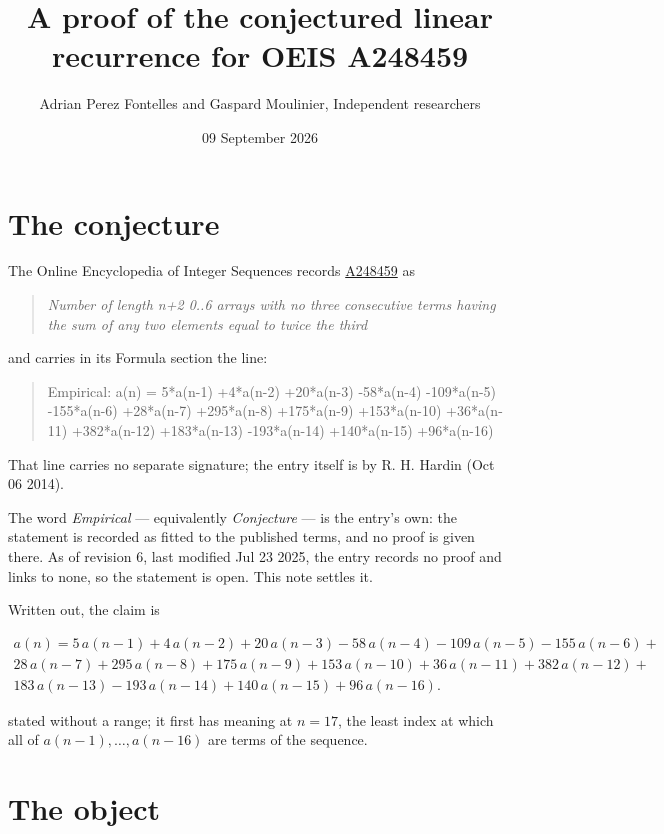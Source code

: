 \documentclass[11pt]{article}
\title{A proof of the conjectured linear recurrence for OEIS A248459}
\author{Adrian Perez Fontelles and Gaspard Moulinier, Independent researchers}
\date{09 September 2026}
\theoremstyle{definition}
\begin{document}
\maketitle
\section{The conjecture}

The Online Encyclopedia of Integer Sequences records \href{https://oeis.org/A248459}{A248459} as

\begin{quote}\itshape Number of length n+2 0..6 arrays with no three consecutive terms having the sum of any two elements equal to twice the third\end{quote}

and carries in its Formula section the line:

\begin{quote}\ttfamily Empirical: a(n) = 5*a(n-1) +4*a(n-2) +20*a(n-3) -58*a(n-4) -109*a(n-5) -155*a(n-6) +28*a(n-7) +295*a(n-8) +175*a(n-9) +153*a(n-10) +36*a(n-11) +382*a(n-12) +183*a(n-13) -193*a(n-14) +140*a(n-15) +96*a(n-16)\end{quote}

That line carries no separate signature; the entry itself is by R. H. Hardin (Oct 06 2014).

The word {\itshape Empirical} --- equivalently {\itshape Conjecture} --- is the entry's own: the statement is recorded as fitted to the published terms, and no proof is given there. As of revision 6, last modified Jul 23 2025, the entry records no proof and links to none, so the statement is open. This note settles it.

Written out, the claim is

\begin{multline*} a(n) = 5\,a(n-1) + 4\,a(n-2) + 20\,a(n-3) - 58\,a(n-4) - 109\,a(n-5) - 155\,a(n-6) + \\ 28\,a(n-7) + 295\,a(n-8) + 175\,a(n-9) + 153\,a(n-10) + 36\,a(n-11) + 382\,a(n-12) + \\ 183\,a(n-13) - 193\,a(n-14) + 140\,a(n-15) + 96\,a(n-16). \end{multline*}

stated without a range; it first has meaning at $n = 17$, the least index at which all of $a(n-1),\dots,a(n-16)$ are terms of the sequence.

\section{The object}
\end{document}
